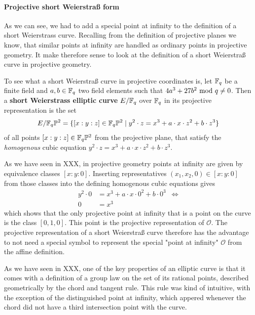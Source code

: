 \paragraph{Projective short Weierstraß form}
As we can see, we had to add a special point at infinity to the definition of a short Weierstrass curve. Recalling from the definition of projective planes we know, that similar points at infinity are handled as ordinary points in projective geometry. It make therefore sense to look at the definition of a short Weierstraß curve in projective geometry.

To see what a short Weierstraß curve in projective coordinates is, let $\mathbb{F}_{q}$ be a finite field and $a,b\in \mathbb{F}_q$ two field elements such that $4a^3+ 27b^2 \text{ mod } q\neq 0$. Then a \textbf{short Weierstrass elliptic curve} $E/\mathbb{F}_q$ over $\mathbb{F}_q$ in its projective representation is the set
\begin{equation}
\label{def_short_weierstrass_curve}
E/\mathbb{F}_q\mathbb{P}^2 = \{[x:y:z]\in \mathbb{F}_q\mathbb{P}^2\;|\; y^2\cdot z = x^3+a\cdot x\cdot z^2 + b\cdot z^3 \}
\end{equation}
of all points $[x:y:z]\in \mathbb{F}_q\mathbb{P}^2$ from the projective plane, that satisfy the \textit{homogenous} cubic equation $y^2\cdot z = x^3+a\cdot x\cdot z^2 + b\cdot z^3$.

As we have seen in XXX, in projective geometry points at infinity are given by equivalence classes $[x:y:0]$. Inserting representatives $(x_1,x_2,0)\in [x:y:0]$ from those classes into the defining homogenous cubic equations gives
\begin{align*}
y^2\cdot 0 & = x^3+a\cdot x\cdot 0^2 + b\cdot 0^3 & \Leftrightarrow \\
0 & = x^3
\end{align*} 
which shows that the only projective point at infinity that is a point on the curve is the class $[0,1,0]$. This point is the projective representation of $\mathcal{O}$. The projective representation of a short Weierstraß curve therefore has the advantage to not need a special symbol to represent the special "point at infinity" $\mathcal{O}$ from the affine definition. 

As we have seen in XXX, one of the key properties of an elliptic curve is that it comes with a definition of a group law on the set of its rational points, described geometrically by the chord and tangent rule. This rule was kind of intuitive, with the exception of the distinguished point at infinity, which appered whenever the chord did not have a third intersection point with the curve.

